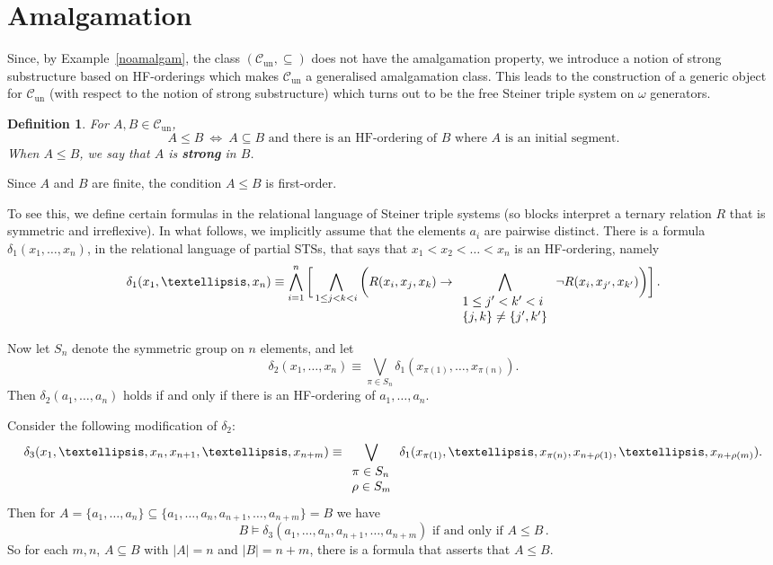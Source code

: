 \documentclass[a4paper, 11pt]{article}
\newcommand{\Cun}{\mathcal{C}_\mathrm{un}}
\theoremstyle{note}
\newtheorem{df}[thm]{Definition}
\begin{document}
	
	\section{Amalgamation} \label{section5}
	
	Since, by Example~\ref{noamalgam}, the class $(\Cun, \subseteq)$ does not have the amalgamation property, we introduce a notion of strong substructure based on HF-orderings which makes $\Cun$ a generalised amalgamation class. This leads to the construction of a generic object for $\Cun$ (with respect to the notion of strong substructure) which turns out to be the free Steiner triple system on $\omega$ generators.
	
	\begin{df} \label{def5_1} For $A, B \in \Cun$,
$$A \leq B \  \Leftrightarrow \ A\subseteq B \mbox{ and there is an HF-ordering of $B$ where $A$ is an initial segment}. $$
When $A \leq B$, we say that $A$ is \textbf{strong} in $B$.
\end{df}

Since $A$ and $B$ are finite, the condition $A \leq B$ is first-order.

To see this, we define certain formulas in the relational language of Steiner triple systems (so blocks interpret a ternary relation $R$ that is symmetric and irreflexive). In what follows, we implicitly assume that the elements $a_i$ are pairwise distinct. There is a formula $\delta_1(x_1, \ldots, x_n)$, in the relational language of partial STSs, that says that $x_1<x_2<\ldots <x_n$ is an HF-ordering, namely
$$\delta_1(x_1, \ldots, x_n) \equiv \bigwedge_{i=1}^n \bigg[ \bigwedge_{1\leq j <k<i} \bigg( R(x_i, x_j, x_k) \rightarrow \bigwedge_{\tiny \begin{array}{l} 1\leq j' <k'<i \\ \{j,k\} \neq \{j',k'\} \end{array}} \neg R(x_i,x_{j'},x_{k'}) \bigg) \bigg] \, .$$

Now let $S_n$ denote the symmetric group on $n$ elements, and let
$$\delta_2 (x_1, \ldots, x_n) \equiv \bigvee_{\pi \in S_n} \delta_1(x_{\pi(1)}, \ldots, x_{\pi(n)}).$$
Then $\delta_2(a_1, \ldots, a_n)$ holds if and only if there is an HF-ordering of $a_1, \ldots, a_n$.

Consider the following modification of $\delta_2$:
$$\delta_3 (x_1, \ldots, x_n, x_{n+1}, \ldots , x_{n+m}) \equiv \bigvee_{\footnotesize \begin{array}{l} \pi \in S_n \\ \rho \in S_m \end{array}} \delta_1(x_{\pi(1)}, \ldots, x_{\pi(n)}, x_{n+\rho(1)}, \ldots, x_{n+\rho(m)}).$$
Then for $A=\{a_1, \ldots, a_n\} \subseteq \{a_1, \ldots, a_n, a_{n+1}, \ldots, a_{n+m}\}=B$ we have 
\[ B \models \delta_3 (a_1, \ldots, a_n, a_{n+1}, \ldots , a_{n+m}) \mbox{ if and only if } A\leq B \,. \]
So for each $m,n$, $A \subseteq B$ with  $|A|=n$ and $|B|=n+m$, there is a formula that asserts that $A \leq B$.
\end{document}
